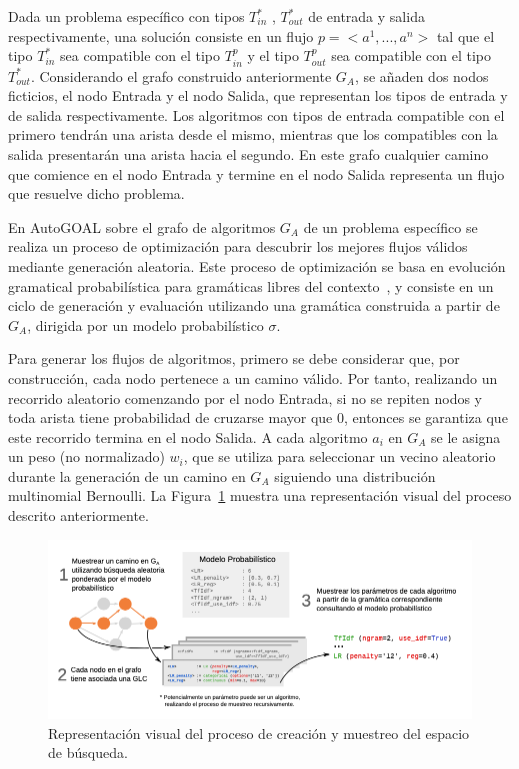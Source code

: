 Dada un problema específico con tipos $T^*_{in}$ , $T^*_{out}$ de entrada y salida respectivamente, una solución consiste en un flujo $p =<a^1, ..., a^n >$ tal que el tipo $T^*_{in}$ sea compatible con el tipo $T^p_{in}$ y el tipo $T^p_{out}$ sea compatible con el tipo $T^*_{out}$. Considerando el grafo construido anteriormente $G_A$, se añaden dos nodos ficticios, el nodo Entrada y el nodo Salida, que representan los tipos de entrada y de salida respectivamente. Los algoritmos con tipos de entrada compatible con el primero tendrán una arista desde el mismo, mientras que los compatibles con la salida presentarán una arista hacia el segundo. En este grafo cualquier camino que comience en el nodo Entrada y termine en el nodo Salida representa un flujo que resuelve dicho problema.

En AutoGOAL sobre el grafo de algoritmos $G_A$ de un problema específico se realiza un proceso de optimización para descubrir los mejores flujos válidos mediante generación aleatoria. Este proceso de optimización se basa en evolución gramatical probabilística para gramáticas libres del contexto~\cite{pge2015}, y consiste en un ciclo de generación y evaluación utilizando una gramática construida a partir de $G_A$, dirigida por un modelo probabilístico $\sigma$.

Para generar los flujos de algoritmos, primero se debe considerar que, por construcción, cada nodo pertenece a un camino válido. Por tanto, realizando un recorrido aleatorio comenzando por el nodo Entrada, si no se repiten nodos y toda arista tiene probabilidad de cruzarse mayor que 0, entonces se garantiza que este recorrido termina en el nodo Salida. A cada algoritmo $a_i$ en $G_A$ se le asigna un peso (no normalizado) $w_i$, que se utiliza para seleccionar un vecino aleatorio durante la generación de un camino en $G_A$ siguiendo una distribución multinomial Bernoulli. La Figura~\ref{fig:autogoal} muestra una representación visual del proceso descrito anteriormente.

\begin{figure}[H]
	\centering
	\includegraphics[scale=.5]{Figures/autogoal.png}
	\caption{Representación visual del proceso de creación y muestreo del
		espacio de búsqueda.}
	\label{fig:autogoal}
\end{figure}

